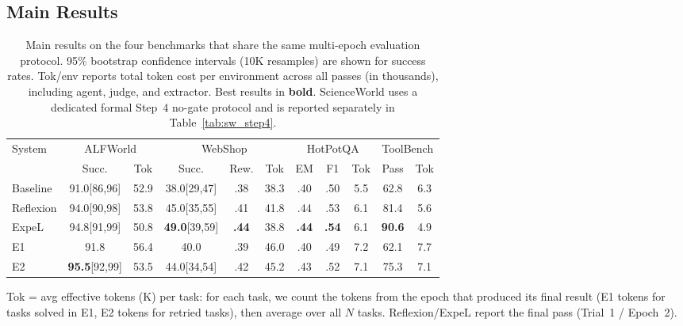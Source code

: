 \subsection{Main Results}
\label{sec:main_results}

\begin{table}[t]
\centering
\caption{Main results on the four benchmarks that share the same multi-epoch evaluation protocol. 95\% bootstrap confidence intervals (10K resamples) are shown for success rates. Tok/env reports total token cost per environment across all passes (in thousands), including agent, judge, and extractor. Best results in \textbf{bold}. ScienceWorld uses a dedicated formal Step~4 no-gate protocol and is reported separately in Table~\ref{tab:sw_step4}.}
\label{tab:main_results}
\footnotesize
\setlength{\tabcolsep}{2.0pt}
\begin{tabular}{l cc ccc ccc cc}
\toprule
\multirow{2}{*}{System} & \multicolumn{2}{c}{ALFWorld} & \multicolumn{3}{c}{WebShop} & \multicolumn{3}{c}{HotPotQA} & \multicolumn{2}{c}{ToolBench} \\
\cmidrule(lr){2-3} \cmidrule(lr){4-6} \cmidrule(lr){7-9} \cmidrule(lr){10-11}
 & Succ. & Tok & Succ. & Rew. & Tok & EM & F1 & Tok & Pass & Tok \\
\midrule
Baseline & 91.0\tiny{[86,96]} & 52.9 & 38.0\tiny{[29,47]} & .38 & 38.3 & .40 & .50 & 5.5 & 62.8 & 6.3 \\
Reflexion & 94.0\tiny{[90,98]} & 53.8 & 45.0\tiny{[35,55]} & .41 & 41.8 & .44 & .53 & 6.1 & 81.4 & 5.6 \\
ExpeL & 94.8\tiny{[91,99]} & 50.8 & \textbf{49.0}\tiny{[39,59]} & \textbf{.44} & 38.8 & \textbf{.44} & \textbf{.54} & 6.1 & \textbf{90.6} & 4.9 \\
\midrule
\method{} E1 & 91.8 & 56.4 & 40.0 & .39 & 46.0 & .40 & .49 & 7.2 & 62.1 & 7.7 \\
\method{} E2 & \textbf{95.5}\tiny{[92,99]} & 53.5 & 44.0\tiny{[34,54]} & .42 & 45.2 & .43 & .52 & 7.1 & 75.3 & 7.1 \\
\bottomrule
\end{tabular}
\vspace{0.3em}

{\footnotesize Tok = avg effective tokens (K) per task: for each task, we count the tokens from the epoch that produced its final result (E1 tokens for tasks solved in E1, E2 tokens for retried tasks), then average over all $N$ tasks. Reflexion/ExpeL report the final pass (Trial~1 / Epoch~2).}
\end{table}

